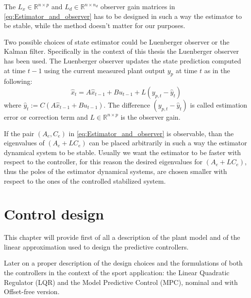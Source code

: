 \documentclass[a4paper,12pt,oneside]{book}
\begin{document}
The $L_x \in \mathbb{R}^{n \times p}$ and $L_d \in \mathbb{R}^{n \times n_d} $ observer gain matrices in \ref{eq:Estimator_and_observer} has to be designed in such a way the estimator to be stable, while the method doesn't matter for our purposes.

\bigskip
Two possible choices of state estimator could be Luenberger observer or the Kalman filter. 
Specifically in the context of this thesis the Luenberger observer has been used.
The Luenberger observer updates the state prediction computed at time $t-1$ using the current measured plant output $y_p$ at time $t$ as in the following:
\begin{equation}
    \hat{x}_t = A \hat{x}_{t-1} + B u_{t-1} + L (y_{p,t} - \hat{y}_t)
\end{equation}
where $\hat{y}_t := C(A \hat{x}_{t-1} + B u_{t-1})$.
The difference $(y_{p,t} - \hat{y}_t)$ is called estimation error or correction term and $L \in \mathbb{R}^{n \times p}$ is the observer gain.

\bigskip
If the pair $(A_e,C_e)$ in \ref{eq:Estimator_and_observer} is observable, than the eigenvalues of $(A_e+LC_e)$ can be placed arbitrarily in such a way the estimator dynamical system to be stable.
Usually we want the estimator to be faster with respect to the controller, for this reason the desired eigenvalues for $(A_e+LC_e)$, thus the poles of the estimator dynamical systems, are chosen smaller with respect to the ones of the controlled stabilized system.

\chapter{Control design}
\label{chapter:Control_design}
This chapter will provide first of all a description of the plant model and of the linear approximation used to design the predictive controllers. 

Later on a proper description of the design choices and the formulations of both the controllers in the context of the sport application: the Linear Quadratic Regulator (LQR) and the Model Predictive Control (MPC), nominal and with Offset-free version.
\end{document}
